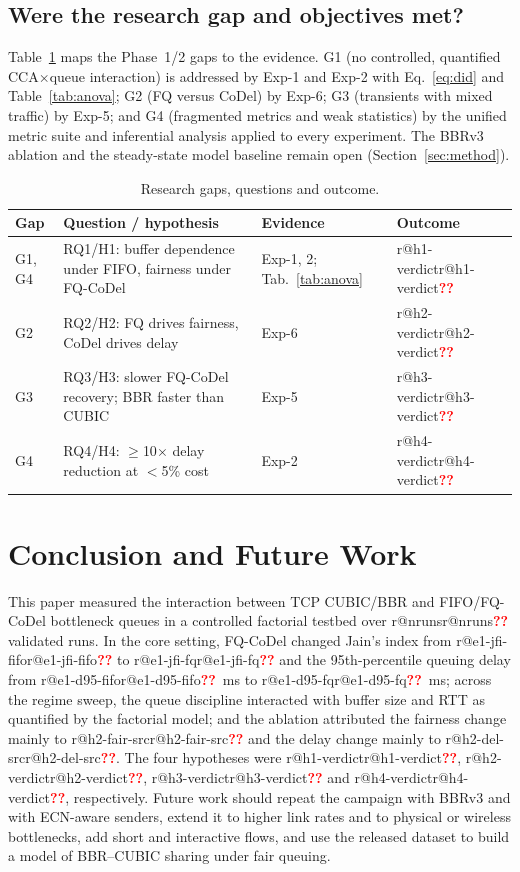 \documentclass[conference]{IEEEtran}
\makeatletter
\newcommand{\R}[1]{\ifcsname r@#1\endcsname\csname r@#1\endcsname\else\textcolor{red}{\textbf{??}}\fi}
\makeatother
\begin{document}
\subsection{Were the research gap and objectives met?}
Table~\ref{tab:goals} maps the Phase~1/2 gaps to the evidence. G1 (no controlled, quantified CCA$\times$queue interaction) is addressed by Exp-1 and Exp-2 with Eq.~\eqref{eq:did} and Table~\ref{tab:anova}; G2 (FQ versus CoDel) by Exp-6; G3 (transients with mixed traffic) by Exp-5; and G4 (fragmented metrics and weak statistics) by the unified metric suite and inferential analysis applied to every experiment. The BBRv3 ablation and the steady-state model baseline remain open (Section~\ref{sec:method}).

\begin{table}[t]
\centering
\caption{Research gaps, questions and outcome.}
\label{tab:goals}
\footnotesize
\begin{tabular}{@{}p{9mm}p{36mm}p{12mm}p{15mm}@{}}
\toprule
Gap & Question / hypothesis & Evidence & Outcome \\
\midrule
G1, G4 & RQ1/H1: buffer dependence under FIFO, fairness under FQ-CoDel & Exp-1, 2; Tab.~\ref{tab:anova} & \R{h1-verdict} \\
G2 & RQ2/H2: FQ drives fairness, CoDel drives delay & Exp-6 & \R{h2-verdict} \\
G3 & RQ3/H3: slower FQ-CoDel recovery; BBR faster than CUBIC & Exp-5 & \R{h3-verdict} \\
G4 & RQ4/H4: $\ge$10$\times$ delay reduction at $<$5\% cost & Exp-2 & \R{h4-verdict} \\
\bottomrule
\end{tabular}
\end{table}

\section{Conclusion and Future Work}
\label{sec:conclusion}

This paper measured the interaction between TCP CUBIC/BBR and FIFO/FQ-CoDel bottleneck queues in a controlled factorial testbed over \R{nruns} validated runs. In the core setting, FQ-CoDel changed Jain's index from \R{e1-jfi-fifo} to \R{e1-jfi-fq} and the 95th-percentile queuing delay from \R{e1-d95-fifo}~ms to \R{e1-d95-fq}~ms; across the regime sweep, the queue discipline interacted with buffer size and RTT as quantified by the factorial model; and the ablation attributed the fairness change mainly to \R{h2-fair-src} and the delay change mainly to \R{h2-del-src}. The four hypotheses were \R{h1-verdict}, \R{h2-verdict}, \R{h3-verdict} and \R{h4-verdict}, respectively. Future work should repeat the campaign with BBRv3 and with ECN-aware senders, extend it to higher link rates and to physical or wireless bottlenecks, add short and interactive flows, and use the released dataset to build a model of BBR--CUBIC sharing under fair queuing.
\end{document}
